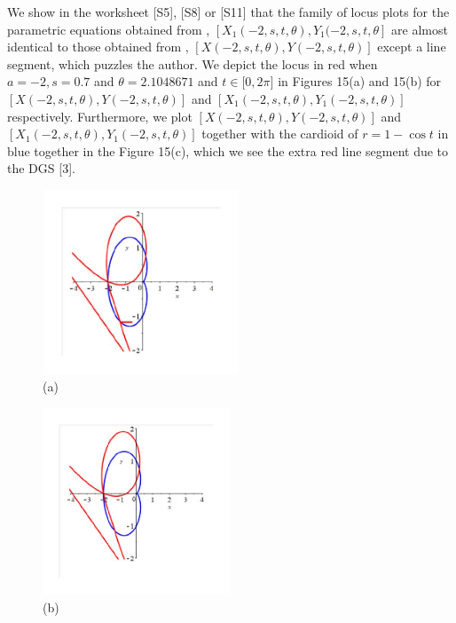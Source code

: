 \documentclass[12pt,a4paper]{article}%
\begin{document}
We show in the worksheet [S5], [S8] or [S11] that the family of locus plots
for the parametric equations obtained from \cite{Maple}, $[X_{1}%
(-2,s,t,\theta),Y_{1}(-2,s,t,\theta]$ are almost identical to those obtained
from \cite{GE}, $[X(-2,s,t,\theta),Y(-2,s,t,\theta)]$ except a line segment,
which puzzles the author. We depict the locus in red when $a=-2,s=0.7$ and
$\theta=2.1048671$ and $t\in\lbrack0,2\pi]$ in Figures 15(a) and 15(b) for
$[X(-2,s,t,\theta),Y(-2,s,t,\theta)]$ and $[X_{1}(-2,s,t,\theta),Y_{1}%
(-2,s,t,\theta)]$ respectively. Furthermore, we plot $[X(-2,s,t,\theta
),Y(-2,s,t,\theta)]$ and $[X_{1}(-2,s,t,\theta),Y_{1}(-2,s,t,\theta)]$
together with the cardioid of $r=1-\cos t$ in blue together in the Figure
15(c), which we see the extra red line segment due to the DGS [3].
\begin{figure}[htpb]
\begin{center}
\parbox[b]{2.3in}{\begin{center}
\includegraphics[natheight=2.820600in,natwidth=3.013100in,height=2.1651in,width=2.3124in]{PJH75I1W.pdf}
 \\ (a)
\end{center}}
\qquad
\parbox[b]{2.3in}{\begin{center}
\includegraphics[natheight=3.062700in,natwidth=3.069800in,height=2.1944in,width=2.1988in]{PJH75I1X.pdf}
 \\ (b)
\end{center}}
\qquad
\parbox[b]{2.3in}{\begin{center}

\end{center}}
\end{center}
\end{figure}
\end{document}
